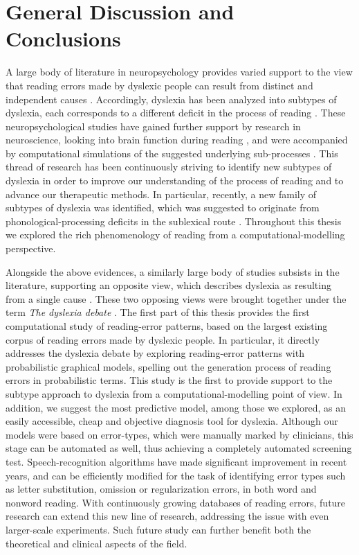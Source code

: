 \chapter*{General Discussion and Conclusions}
A large body of literature in neuropsychology provides varied support to the view that reading errors made by dyslexic people can result from distinct and independent causes \citep{mn73, sw77, c83, c96, shallice2000selective, friedmann2001letter}. Accordingly, dyslexia has been analyzed into subtypes of dyslexia, each corresponds to a different deficit in the process of reading \citep[for a review, see,  ][]{ck12}. These neuropsychological studies have gained further support by research in neuroscience, looking into brain function during reading \citep{fiebach2002fmri, joubert2004neural, levy2009testing}, and were accompanied by computational simulations of the suggested underlying sub-processes \citep{coltheart2001drc, perry2007nested}. This thread of research has been continuously striving to identify new subtypes of dyslexia in order to improve our understanding of the process of reading and to advance our therapeutic methods. In particular, recently, a new family of subtypes of dyslexia was identified, which was suggested to originate from phonological-processing deficits in the sublexical route \citep{Gvion2010, Gvion2012}. Throughout this thesis we explored the rich phenomenology of reading from a computational-modelling perspective. 

Alongside the above evidences, a similarly large body of studies subsists in the literature, supporting an opposite view, which describes dyslexia as resulting from a single cause \citep{s98, s00, ss05, rrddcw03, rs08, d09, bdvsgmg13, vgpsh13, grggvfb02, r14}. These two opposing views were brought together under the term \textit{The dyslexia debate} \citep{eg14}. The first part of this thesis provides the first computational study of reading-error patterns, based on the largest existing corpus of reading errors made by dyslexic people. In particular, it directly addresses the dyslexia debate by exploring reading-error patterns with probabilistic graphical models, spelling out the generation process of reading errors in probabilistic terms. This study is the first to provide support to the subtype approach to dyslexia from a computational-modelling point of view. In addition, we suggest the most predictive model, among those we explored, as an easily accessible, cheap and objective diagnosis tool for dyslexia. Although our models were based on error-types, which were manually marked by clinicians, this stage can be automated as well, thus achieving a completely automated screening test. Speech-recognition algorithms have made significant improvement in recent years, and can be efficiently modified for the task of identifying error types such as letter substitution, omission or regularization errors, in both word and nonword reading. With continuously growing databases of reading errors, future research can extend this new line of research, addressing the issue with even larger-scale experiments. Such future study can further benefit both the theoretical and clinical aspects of the field. 

